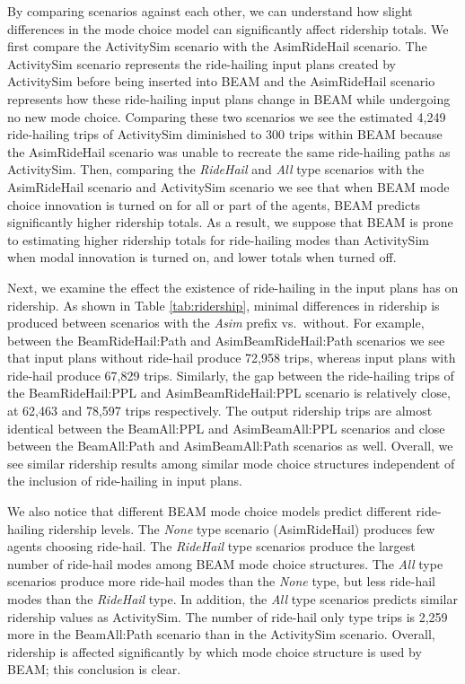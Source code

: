 \documentclass[fancy, masters]{byuthesis}
\begin{document}
By comparing scenarios against each other, we can understand how slight differences in the mode choice model can significantly affect ridership totals. We first compare the ActivitySim scenario with the AsimRideHail scenario. The ActivitySim scenario represents the ride-hailing input plans created by ActivitySim before being inserted into BEAM and the AsimRideHail scenario represents how these ride-hailing input plans change in BEAM while undergoing no new mode choice. Comparing these two scenarios we see the estimated 4,249 ride-hailing trips of ActivitySim diminished to 300 trips within BEAM because the AsimRideHail scenario was unable to recreate the same ride-hailing paths as ActivitySim. Then, comparing the \emph{RideHail} and \emph{All} type scenarios with the AsimRideHail scenario and ActivitySim scenario we see that when BEAM mode choice innovation is turned on for all or part of the agents, BEAM predicts significantly higher ridership totals. As a result, we suppose that BEAM is prone to estimating higher ridership totals for ride-hailing modes than ActivitySim when modal innovation is turned on, and lower totals when turned off.

Next, we examine the effect the existence of ride-hailing in the input plans has on ridership. As shown in Table \ref{tab:ridership}, minimal differences in ridership is produced between scenarios with the \emph{Asim} prefix vs.~without. For example, between the BeamRideHail:Path and AsimBeamRideHail:Path scenarios we see that input plans without ride-hail produce 72,958 trips, whereas input plans with ride-hail produce 67,829 trips. Similarly, the gap between the ride-hailing trips of the BeamRideHail:PPL and AsimBeamRideHail:PPL scenario is relatively close, at 62,463 and 78,597 trips respectively. The output ridership trips are almost identical between the BeamAll:PPL and AsimBeamAll:PPL scenarios and close between the BeamAll:Path and AsimBeamAll:Path scenarios as well. Overall, we see similar ridership results among similar mode choice structures independent of the inclusion of ride-hailing in input plans.

We also notice that different BEAM mode choice models predict different ride-hailing ridership levels. The \emph{None} type scenario (AsimRideHail) produces few agents choosing ride-hail. The \emph{RideHail} type scenarios produce the largest number of ride-hail modes among BEAM mode choice structures. The \emph{All} type scenarios produce more ride-hail modes than the \emph{None} type, but less ride-hail modes than the \emph{RideHail} type. In addition, the \emph{All} type scenarios predicts similar ridership values as ActivitySim. The number of ride-hail only type trips is 2,259 more in the BeamAll:Path scenario than in the ActivitySim scenario. Overall, ridership is affected significantly by which mode choice structure is used by BEAM; this conclusion is clear.
\end{document}
